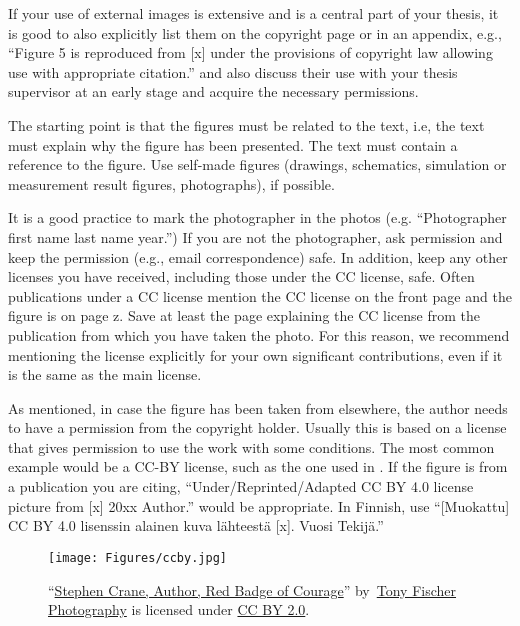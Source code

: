 If your use of external images is extensive and is a central part of
your thesis, it is good to also explicitly list them on the copyright
page or in an appendix, e.g., ``Figure 5 is reproduced from [x] under
the provisions of copyright law allowing use with appropriate
citation.'' and also discuss their use with your thesis supervisor at
an early stage and acquire the necessary permissions.

The starting point is that the figures must be related to the text,
i.e, the text must explain why the figure has been presented. The text
must contain a reference to the figure. Use self-made figures
(drawings, schematics, simulation or measurement result figures,
photographs), if possible.

It is a good practice to mark the photographer in the photos
(e.g. “Photographer first name last name year.”) If you are not the
photographer, ask permission and keep the permission (e.g., email
correspondence) safe. In addition, keep any other licenses you have
received, including those under the CC license, safe. Often
publications under a CC license mention the CC license on the front
page and the figure is on page z. Save at least the page explaining
the CC license from the publication from which you have taken the
photo. For this reason, we recommend mentioning the license explicitly
for your own significant contributions, even if it is the same as
the main license.

As mentioned, in case the figure has been taken from elsewhere, the
author needs to have a permission from the copyright holder. Usually
this is based on a license that gives permission to use the work with
some conditions. The most common example would be a CC-BY license,
such as the one used in . If the figure is from a
publication you are citing, ``Under/Reprinted/Adapted CC BY 4.0 license
picture from [x] \textcopyright 20xx Author.'' would be
appropriate. In Finnish, use ``[Muokattu] CC BY 4.0 lisenssin alainen
kuva lähteestä [x]. \textcopyright Vuosi Tekijä.''

\begin{figure}[H]
\begin{center}
  \texttt{[image: Figures/ccby.jpg]}
\end{center}
\caption{``\href{https://openverse.org/image/110032f8-1a7a-421f-86b1-88fdfde2e44f
  }{Stephen Crane, Author, Red Badge of Courage}''
  by~\href{https://www.flickr.com/photos/tonythemisfit/}{Tony Fischer
  Photography} is licensed under
\href{https://creativecommons.org/licenses/by/2.0/}{CC BY 2.0}.}
\label{fig:ccbypic}
\end{figure}

